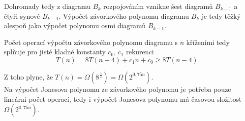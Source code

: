 \begin{dukaz}
Dohromady tedy z diagramu $B_k$ rozpojováním vznikne šest diagramů $B_{k-1}$ a čtyři synové $B_{k-1}$. Výpočet závorkového polynomu diagramu $B_k$ je tedy těžký alespoň jako výpočet polynomu osmi diagramů $B_{k-1}$. 

Počet operací výpočtu závorkového polynomu diagramu s $n$ kříženími tedy splňuje pro jisté kladné konstanty $c_0$, $c_1$ rekurenci
$$ T(n) = 8T(n-4) + c_1 n + c_0 \geq 8T(n-4). $$


Z toho plyne, že $T(n) = \Omega(8^{\frac{n}{4}})  =  \Omega(2^{0,75 n})$. \\

Na výpočet Jonesova polynomu ze závorkového polynomu je potřeba pouze lineární počet operací, tedy i výpočet Jonesova polynomu má časovou složitost $\Omega(2^{0,75n})$.
\end{dukaz}
